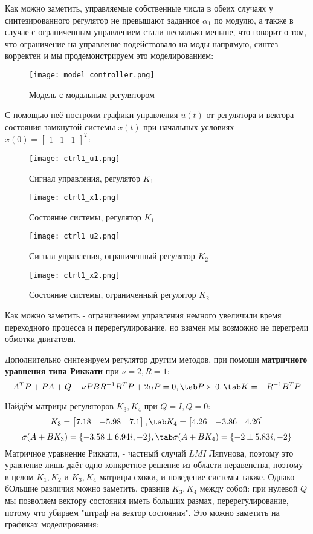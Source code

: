 Как можно заметить, управляемые собственные числа в обеих случаях у синтезированного регулятор не превышают заданное $\alpha_1$ по модулю, 
а также в случае с ограниченным управлением стали несколько меньше, что говорит о том, что ограничение на управление подействовало на моды напрямую, 
синтез корректен и мы продемонстрируем это моделированием:



\begin{figure}[ht]
  \centering
  \texttt{[image: model\_controller.png]}
  \caption{Модель с модальным регулятором}
\end{figure}


С помощью неё построим графики управления $u(t)$ от регулятора и вектора состояния замкнутой системы $x(t)$
при начальных условиях $x(0) = \begin{bmatrix} 1 & 1 & 1 \end{bmatrix}^T$:
\newpage
\begin{figure}[ht]
  \centering
  \texttt{[image: ctrl1\_u1.png]}
  \caption{Сигнал управления, регулятор $K_1$}
\end{figure}
\begin{figure}[ht]
  \centering
  \texttt{[image: ctrl1\_x1.png]}
  \caption{Состояние системы, регулятор $K_1$}
\end{figure}
\newpage
\begin{figure}[ht]
  \centering
  \texttt{[image: ctrl1\_u2.png]}
  \caption{Сигнал управления, ограниченный регулятор $K_2$}
\end{figure}
\begin{figure}[ht]
  \centering
  \texttt{[image: ctrl1\_x2.png]}
  \caption{Состояние системы, ограниченный регулятор $K_2$}
\end{figure}

Как можно заметить - ограничением управления немного увеличили время переходного процесса и перерегулирование, но взамен мы возможно не перегрели обмотки двигателя.

Дополнительно синтезируем регулятор другим методов, при помощи \textbf{матричного уравнения типа Риккати} при $\nu=2, R=1$:
$$
  A^TP + PA + Q - \nu PBR^{-1}B^T P + 2\alpha P =0, \tab P \succ 0, \tab K=-R^{-1}B^TP
$$

Найдём матрицы регуляторов $K_3, K_4$ при $Q = I, Q = 0$:
$$
  K_3 = \begin{bmatrix}
      7.18 & -5.98 & 7.1
    \end{bmatrix}, \tab
  K_4 = \begin{bmatrix}
    4.26 & -3.86 & 4.26
  \end{bmatrix}
$$
$$
  \sigma(A+BK_3)=\{ -3.58 \pm 6.94i, -2 \}, \tab \sigma(A+BK_4)=\{ -2 \pm 5.83i, -2 \}
$$
Матричное уравнение Риккати, - частный случай $LMI$ Ляпунова, поэтому это уравнение лишь даёт одно конкретное решение из области неравенства,
поэтому в целом $K_1, K_2$ и $K_3, K_4$ матрицы схожи, и поведение системы также. 
Однако бОльшие различия можно заметить, сравнив $K_3, K_4$ между собой: при нулевой $Q$ мы позволяем вектору состояния иметь больших размах, перерегулирование, потому что убираем
"штраф на вектор состояния". Это можно заметить на графиках моделирования:

